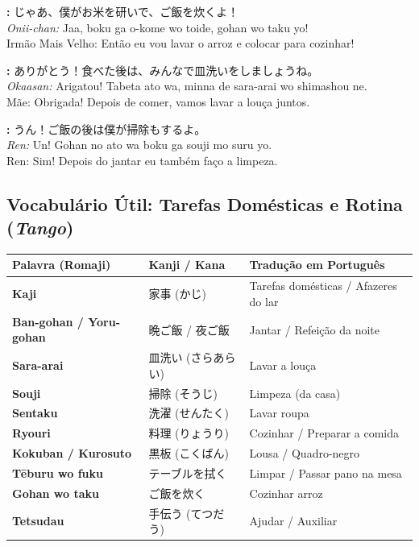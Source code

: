 \documentclass[12pt,a4paper]{article}
\begin{document}
\vspace{0.4em}

\textbf{:} じゃあ、僕がお米を研いで、ご飯を炊くよ！\\
\textit{Onii-chan:} Jaa, boku ga o-kome wo toide, gohan wo taku yo!\\
Irmão Mais Velho: Então eu vou lavar o arroz e colocar para cozinhar!

\vspace{0.4em}

\textbf{:} ありがとう！食べた後は、みんなで皿洗いをしましょうね。\\
\textit{Okaasan:} Arigatou! Tabeta ato wa, minna de sara-arai wo shimashou ne.\\
Mãe: Obrigada! Depois de comer, vamos lavar a louça juntos.

\vspace{0.4em}

\textbf{:} うん！ご飯の後は僕が掃除もするよ。\\
\textit{Ren:} Un! Gohan no ato wa boku ga souji mo suru yo.\\
Ren: Sim! Depois do jantar eu também faço a limpeza.

\newpage

\subsection*{Vocabulário Útil: Tarefas Domésticas e Rotina (\textit{Tango})}

\vspace{0.2cm}

\noindent
\small
\begin{tabularx}{\textwidth}{>{\bfseries\color{jpnavy}}l X X}
\toprule
Palavra (Romaji) & Kanji / Kana & Tradução em Português \\
\midrule
Kaji & 家事 (かじ) & Tarefas domésticas / Afazeres do lar \\
Ban-gohan / Yoru-gohan & 晩ご飯 / 夜ご飯 & Jantar / Refeição da noite \\
Sara-arai & 皿洗い (さらあらい) & Lavar a louça \\
Souji & 掃除 (そうじ) & Limpeza (da casa) \\
Sentaku & 洗濯 (せんたく) & Lavar roupa \\
Ryouri & 料理 (りょうり) & Cozinhar / Preparar a comida \\
\midrule
Kokuban / Kurosuto & 黒板 (こくばん) & Lousa / Quadro-negro \\
Tēburu wo fuku & テーブルを拭く & Limpar / Passar pano na mesa \\
Gohan wo taku & ご飯を炊く & Cozinhar arroz \\
Tetsudau & 手伝う (てつだう) & Ajudar / Auxiliar \\
\bottomrule
\end{tabularx}
\end{document}
